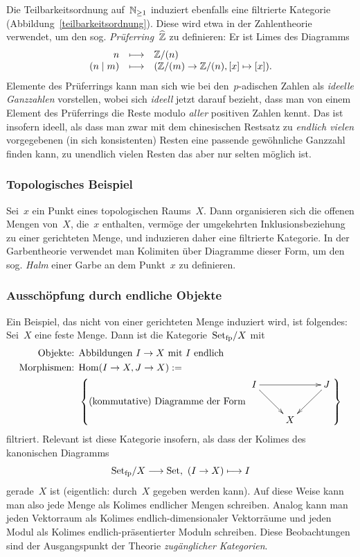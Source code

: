 Die Teilbarkeitsordnung auf~$\mathbb{N}_{\geq 1}$ induziert ebenfalls eine
filtrierte Kategorie (Abbildung~\ref{teilbarkeitsordnung}). Diese wird etwa
in der Zahlentheorie verwendet, um den sog. \emph{Prüferring}~$\widehat{\mathbb{Z}}$ zu
definieren: Er ist Limes des Diagramms
\[ \begin{array}{@{}rcl@{}}
  n &\longmapsto& \ZZ/(n) \\
  (n \mid m) &\longmapsto& (\ZZ/(m) \to \ZZ/(n), [x] \mapsto [x]).
\end{array} \]
Elemente des Prüferrings kann man sich wie bei den~$p$-adischen Zahlen als
\emph{ideelle Ganzzahlen} vorstellen, wobei sich \emph{ideell} jetzt darauf
bezieht, dass man von einem Element des Prüferrings die Reste modulo
\emph{aller} positiven Zahlen kennt. Das ist insofern ideell, als dass man zwar
mit dem chinesischen Restsatz zu \emph{endlich vielen} vorgegebenen (in sich
konsistenten) Resten eine passende gewöhnliche Ganzzahl finden kann, zu
unendlich vielen Resten das aber nur selten möglich ist.


\subsubsection*{Topologisches Beispiel}

Sei~$x$ ein Punkt eines topologischen Raums~$X$. Dann organisieren sich
die offenen Mengen von~$X$, die~$x$ enthalten, vermöge der umgekehrten
Inklusionsbeziehung zu einer gerichteten Menge, und induzieren daher eine
filtrierte Kategorie. In der Garbentheorie verwendet man Kolimiten über
Diagramme dieser Form, um den sog. \emph{Halm} einer Garbe an dem Punkt~$x$ zu
definieren.


\subsubsection*{Ausschöpfung durch endliche Objekte}

Ein Beispiel, das nicht von einer gerichteten Menge induziert wird, ist
folgendes: Sei~$X$ eine feste Menge. Dann ist die Kategorie~$\mathrm{Set}_\mathrm{fp}/X$ mit
\begin{align*}
  \text{Objekte: } & \text{Abbildungen $I \to X$ mit $I$ endlich} \\
  \text{Morphismen: } &
    \Hom(I \to X, J \to X) := \\ & \left\{
    \text{(kommutative) Diagramme der Form $\vcenter{\xymatrix{
       I \ar[rr] \ar[dr] & & J \ar[ld] \\
       & X
      }}$} \right\}
\end{align*}
filtriert. Relevant ist diese Kategorie insofern, als dass der Kolimes des
kanonischen Diagramms
\[ \mathrm{Set}_\mathrm{fp}/X \longrightarrow \mathrm{Set},\ (I \to X) \longmapsto I \]
gerade~$X$ ist (eigentlich: durch~$X$ gegeben werden kann). Auf diese Weise
kann man also jede Menge als Kolimes endlicher Mengen schreiben.
Analog kann man jeden Vektorraum als Kolimes endlich-dimensionaler Vektorräume
und jeden Modul als Kolimes endlich-präsentierter Moduln schreiben. Diese
Beobachtungen sind der Ausgangspunkt der Theorie \emph{zugänglicher Kategorien}.

